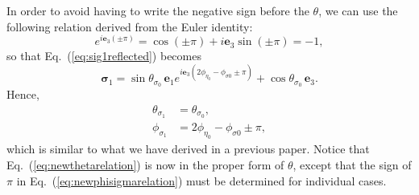\documentclass[a4paper,twocolumn,superscriptaddress]{revtex4-1}
\begin{document}
{In order to avoid having to write the negative sign before the $\theta$, 
we can use the following relation derived from the Euler identity:
	\begin{equation} \label{eq:eulerpi}
		e^{i \mathbf e_3 (\pm \pi)} = \cos (\pm \pi) + i \mathbf e_3 \sin (\pm \pi) = -1 ,
	\end{equation}
so that Eq.~(\ref{eq:sig1reflected}) becomes
\begin{equation}
  \bm \sigma_1  = 
  \sin \theta_{ \sigma_0 } \, 
  \mathbf e_1 e^{ i \mathbf e_3 (2\phi_{ \eta_0 } - \phi_{\sigma0} \pm \pi ) } 
  + \cos \theta_{ \sigma_0 } \, \mathbf e_3 .
\end{equation}
Hence,
\begin{subequations} 
  \label{eq:newanglerelations}
  \begin{align} 
    \label{eq:newthetarelation} \theta_{ \sigma_1 } &= \theta_{ \sigma_0 } ,
    \\
\label{eq:newphisigmarelation}
\phi_{ \sigma_1 } &= 2\phi_{ \eta_0 } - \phi_{\sigma0} \pm \pi ,
  \end{align}
\end{subequations}
which is similar to what we have derived in a previous paper\cite{sugonSPP}.
Notice that Eq.~(\ref{eq:newthetarelation}) is now in the proper form of $\theta$, except that the sign of $\pi$ in Eq.~(\ref{eq:newphisigmarelation}) must be determined for individual cases.





}
\end{document}
